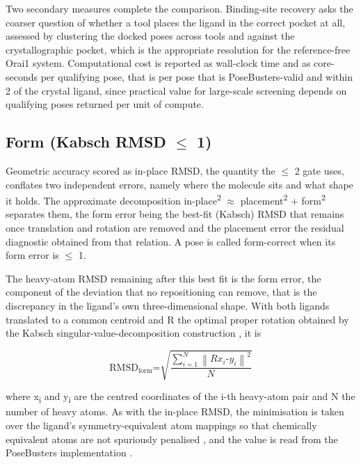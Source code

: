 Two secondary measures complete the comparison. Binding-site recovery asks the coarser question of whether a tool places the ligand in the correct pocket at all, assessed by clustering the docked poses across tools and against the crystallographic pocket, which is the appropriate resolution for the reference-free Orai1 system. Computational cost is reported as wall-clock time and as core-seconds per qualifying pose, that is per pose that is PoseBusters-valid and within 2\angstrom{} of the crystal ligand, since practical value for large-scale screening depends on qualifying poses returned per unit of compute.

\hypertarget{form-kabsch-rmsd-1-uxe5}{%
\subsection{\texorpdfstring{Form (Kabsch RMSD \ensuremath{\leq} 1\angstrom{})}{Form (Kabsch RMSD <= 1 Angstrom)}}\label{form-kabsch-rmsd-1-uxe5}}

Geometric accuracy scored as in-place RMSD, the quantity the \ensuremath{\leq} 2\angstrom{} gate uses, conflates two independent errors, namely where the molecule sits and what shape it holds. The approximate decomposition in-place\textsuperscript{2} \ensuremath{\approx} placement\textsuperscript{2} + form\textsuperscript{2} separates them, the form error being the best-fit (Kabsch) RMSD that remains once translation and rotation are removed and the placement error the residual diagnostic obtained from that relation. A pose is called form-correct when its form error is \ensuremath{\leq} 1\angstrom{}.

The heavy-atom RMSD remaining after this best fit is the form error, the component of the deviation that no repositioning can remove, that is the discrepancy in the ligand's own three-dimensional shape. With both ligands translated to a common centroid and R the optimal proper rotation obtained by the Kabsch singular-value-decomposition construction \cite{ref062}, it is

\[\text{RMSD}_{\text{form}}\text{=}\sqrt{\frac{\sum_{i = 1}^{N}\left\| Rx_{i}\text{-}y_{i} \right\|^{\text{2}}}{N}}\]

where x\textsubscript{i} and y\textsubscript{i} are the centred coordinates of the i-th heavy-atom pair and N the number of heavy atoms. As with the in-place RMSD, the minimisation is taken over the ligand's symmetry-equivalent atom mappings so that chemically equivalent atoms are not spuriously penalised \cite{ref044}, and the value is read from the PoseBusters implementation \cite{ref035}.

